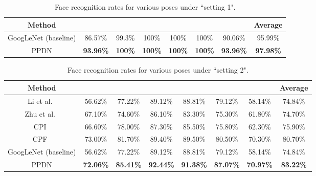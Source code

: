 \documentclass[runningheads]{llncs}
\begin{document}
\setlength{\tabcolsep}{2pt}
\begin{table}[!tp]
	\begin{center}
		\caption{Face recognition rates for various poses under ``setting 1". }
		\label{table:face recognition}
		\begin{tabular}{c|c|c|c|c|c|c|c}
			\hline\noalign{\smallskip}
			Method  & & & & & & &Average\\

			\hline

			GoogLeNet (baseline)& 86.57\% & 99.3\% & 100\% & 100\%& 100\% &90.06\% & 95.99\%\\
			PPDN & \textbf{93.96\%}& \textbf{100\%} & \textbf{100\%} & \textbf{100\%} & \textbf{100\%} & \textbf{93.96\%} & \textbf{97.98\%}\\
			\hline
		\end{tabular}
	\end{center}
\end{table}


\setlength{\tabcolsep}{2pt}
\begin{table}[!tp]
	\begin{center}
		\caption{Face recognition rates for various poses under ``setting 2". }
		\label{table:face recognition2}
		\begin{tabular}{c|c|c|c|c|c|c|c}
			\hline\noalign{\smallskip}
			Method  & & & & & & &Average\\

			\hline

			Li et al.~\cite{li2012coupled}& 56.62\% & 77.22\% & 89.12\% & 88.81\%& 79.12\% &58.14\% & 74.84\%\\
			Zhu et al.~\cite{zhu2013deep}& 67.10\% & 74.60\% & 86.10\% & 83.30\%& 75.30\% &61.80\% & 74.70\%\\
			CPI~\cite{yim2015rotating}& 66.60\% & 78.00\% & 87.30\% & 85.50\%& 75.80\% &62.30\% & 75.90\%\\
			CPF~\cite{yim2015rotating}& 73.00\% & 81.70\% & 89.40\% & 89.50\%& 80.50\% &70.30\% & 80.70\%\\
			GoogLeNet (baseline)& 56.62\% & 77.22\% & 89.12\% & 88.81\%& 79.12\% &58.14\% & 74.84\%\\
			\hline
			PPDN & \textbf{72.06\%} & \textbf{85.41\%} & \textbf{92.44\%} & \textbf{91.38\%}& \textbf{87.07\%} &\textbf{70.97\%} & \textbf{83.22\%}\\
			\hline
		\end{tabular}
	\end{center}
\end{table}
\end{document}
